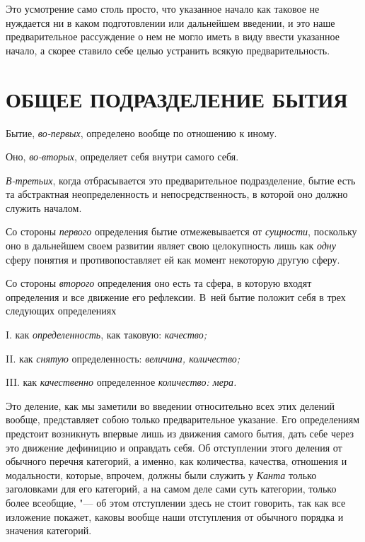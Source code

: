 Это усмотрение само столь просто, что указанное начало как таковое не
нуждается ни в каком подготовлении или дальнейшем введении, и это наше
предварительное рассуждение о нем не могло иметь в виду ввести указанное
начало, а скорее ставило себе целью устранить всякую предварительность.

\section[\hspace{8mm}Общее подразделение бытия]{ОБЩЕЕ ПОДРАЗДЕЛЕНИЕ БЫТИЯ}
Бытие, {\em во-первых}, определено вообще по отношению к иному.

Оно, {\em во-вторых}, определяет себя внутри самого себя.

{\em В-третьих}, когда отбрасывается это предварительное
подразделение, бытие есть та абстрактная неопределенность и
непосредственность, в которой оно должно служить началом.

Со стороны {\em первого} определения бытие
отмежевывается от {\em сущности}, поскольку оно в
дальнейшем своем развитии являет свою целокупность лишь как
{\em одну} сферу понятия и противопоставляет ей как
момент некоторую другую сферу.

Со стороны {\em второго} определения оно есть та сфера,
в которую входят определения и все движение его рефлексии. В~ней бытие
положит себя в трех следующих определениях

I. как {\em определенность}, как таковую: {\em качество;}

II. как {\em снятую} определенность: {\em величина, количество;}

III. как {\em качественно} определенное {\em количество: мера.}

Это деление, как мы заметили во введении относительно всех этих делений
вообще, представляет собою только предварительное указание. Его
определениям предстоит возникнуть впервые лишь из движения самого бытия,
дать себе через это движение дефиницию и оправдать себя. Об отступлении
этого деления от обычного перечня категорий, а именно, как количества,
качества, отношения и модальности, которые, впрочем, должны были служить у
{\em Канта} только заголовками для его категорий, а на
самом деле сами суть категории, только более всеобщие, "--- об этом
отступлении здесь не стоит говорить, так как все изложение покажет, каковы
вообще наши отступления от обычного порядка и значения категорий.


